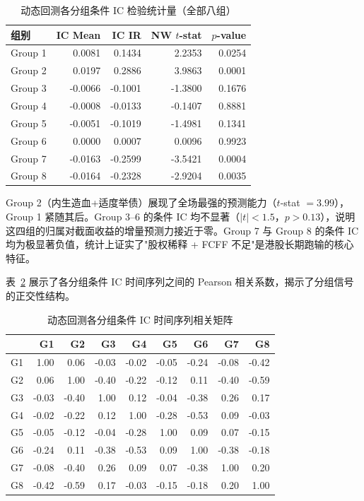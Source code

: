 \documentclass[a4paper,10pt]{article}
\begin{document}
\begin{table}[H]
    \centering
    \caption{动态回测各分组条件 IC 检验统计量（全部八组）}
    \label{tab:ic_stats_dyn}
    \begin{tabular}{lrrrr}
        \toprule
        \textbf{组别} & \textbf{IC Mean} & \textbf{IC IR} & \textbf{NW $t$-stat} & \textbf{$p$-value} \\
        \midrule
        Group 1 &  0.0081 &  0.1434 &  2.2353 & 0.0254 \\
        Group 2 &  0.0197 &  0.2886 &  3.9863 & 0.0001 \\
        Group 3 & -0.0066 & -0.1001 & -1.3800 & 0.1676 \\
        Group 4 & -0.0008 & -0.0133 & -0.1407 & 0.8881 \\
        Group 5 & -0.0051 & -0.1019 & -1.4981 & 0.1341 \\
        Group 6 &  0.0000 &  0.0007 &  0.0096 & 0.9923 \\
        Group 7 & -0.0163 & -0.2599 & -3.5421 & 0.0004 \\
        Group 8 & -0.0164 & -0.2328 & -2.9204 & 0.0035 \\
        \bottomrule
    \end{tabular}
\end{table}

Group 2（内生造血+适度举债）展现了全场最强的预测能力（$t$-stat $= 3.99$），Group 1 紧随其后。Group 3--6 的条件 IC 均不显著（$|t| < 1.5$，$p > 0.13$），说明这四组的归属对截面收益的增量预测力接近于零。Group 7 与 Group 8 的条件 IC 均为极显著负值，统计上证实了"股权稀释 + FCFF 不足"是港股长期跑输的核心特征。

表~\ref{tab:ic_corr_dyn} 展示了各分组条件 IC 时间序列之间的 Pearson 相关系数，揭示了分组信号的正交性结构。

\begin{table}[H]
    \centering
    \caption{动态回测各分组条件 IC 时间序列相关矩阵}
    \label{tab:ic_corr_dyn}
    \scriptsize
    \begin{tabular}{lrrrrrrrr}
        \toprule
        & G1 & G2 & G3 & G4 & G5 & G6 & G7 & G8 \\
        \midrule
        G1 &  1.00 &  0.06 & -0.03 & -0.02 & -0.05 & -0.24 & -0.08 & -0.42 \\
        G2 &  0.06 &  1.00 & -0.40 & -0.22 & -0.12 &  0.11 & -0.40 & -0.59 \\
        G3 & -0.03 & -0.40 &  1.00 &  0.12 & -0.04 & -0.38 &  0.26 &  0.17 \\
        G4 & -0.02 & -0.22 &  0.12 &  1.00 & -0.28 & -0.53 &  0.09 & -0.03 \\
        G5 & -0.05 & -0.12 & -0.04 & -0.28 &  1.00 &  0.09 &  0.07 & -0.15 \\
        G6 & -0.24 &  0.11 & -0.38 & -0.53 &  0.09 &  1.00 & -0.38 & -0.18 \\
        G7 & -0.08 & -0.40 &  0.26 &  0.09 &  0.07 & -0.38 &  1.00 &  0.20 \\
        G8 & -0.42 & -0.59 &  0.17 & -0.03 & -0.15 & -0.18 &  0.20 &  1.00 \\
        \bottomrule
    \end{tabular}
\end{table}
\end{document}
